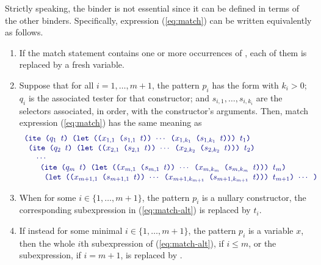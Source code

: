 Strictly speaking, the  binder is not essential 
since it can be defined in terms of the other binders. 
Specifically, expression (\ref{eq:match})
can be written equivalently as follows.
\begin{enumerate}
\item 
If the match statement contains one or more occurrences of \expr{\_}, 
each of them is replaced by a fresh variable.
\item
Suppose that for all $i=1,\ldots, m + 1$, the pattern $p_i$ has the form
 with $k_i>0$;
$q_i$ is the associated tester for that constructor; and
$s_{i,1}, \ldots, s_{i,k_i}$ are the selectors associated, in order,
with the constructor's arguments.
Then, match expression (\ref{eq:match}) has the same meaning as 
%
\begin{equation} \label{eq:match-alt}
\begin{array}{l}
\expr{(ite ($q_1$ $t$) 
 (let (($x_{1,1}$ ($s_{1,1}$ $t$)) $\cdots$ ($x_{1,k_1}$ ($s_{1,k_1}$ $t$))) $t_1$)}
\\
\expr{ (ite ($q_2$ $t$) 
 (let (($x_{2,1}$ ($s_{2,1}$ $t$)) $\cdots$ ($x_{2,k_2}$ ($s_{2,k_2}$ $t$))) $t_2$)}
\\
\quad \expr{ $\cdots$}
\\
\quad\quad\expr{(ite ($q_m$ $t$) 
 (let (($x_{m,1}$ ($s_{m,1}$ $t$)) $\cdots$ ($x_{m,k_m}$ ($s_{m,k_m}$ $t$))) $t_m$)}
\\
\quad\quad\expr{ (let (($x_{m+1,1}$ ($s_{m+1,1}$ $t$)) $\cdots$ ($x_{m+1,k_{m+1}}$ ($s_{m+1,k_{m+1}}$ $t$))) $t_{m+1}$) $\cdots$ ) }
\end{array}
\end{equation}

\item 
When for some $i \in \{1,\ldots, m + 1\}$, the pattern $p_i$ is a nullary constructor, 
the corresponding  subexpression in (\ref{eq:match-alt}) is replaced 
by $t_i$.

\item 
If instead for some minimal $i \in \{1,\ldots, m + 1\}$, the pattern $p_i$ is
a variable $x$, then the whole $i$th  subexpression of (\ref{eq:match-alt}),
if $i\leq m$, 
or the  subexpression, if $i=m + 1$, is replaced by .
\end{enumerate}


